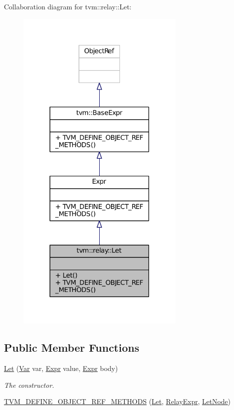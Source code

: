 Collaboration diagram for tvm\+:\+:relay\+:\+:Let\+:
\nopagebreak
\begin{figure}[H]
\begin{center}
\leavevmode
\includegraphics[width=230pt]{classtvm_1_1relay_1_1Let__coll__graph}
\end{center}
\end{figure}
\subsection*{Public Member Functions}
\begin{DoxyCompactItemize}
\item 
\hyperlink{classtvm_1_1relay_1_1Let_a68715334aa9a190648260e776c17ca69}{Let} (\hyperlink{classtvm_1_1relay_1_1Var}{Var} var, \hyperlink{namespacetvm_1_1relay_a5b84e3790f89bb3fad5c7911eeb99531}{Expr} value, \hyperlink{namespacetvm_1_1relay_a5b84e3790f89bb3fad5c7911eeb99531}{Expr} body)
\begin{DoxyCompactList}\small\item\em The constructor. \end{DoxyCompactList}\item 
\hyperlink{classtvm_1_1relay_1_1Let_ad0ec0a1b7a38da71c3e56b6ed78b4c16}{T\+V\+M\+\_\+\+D\+E\+F\+I\+N\+E\+\_\+\+O\+B\+J\+E\+C\+T\+\_\+\+R\+E\+F\+\_\+\+M\+E\+T\+H\+O\+DS} (\hyperlink{classtvm_1_1relay_1_1Let}{Let}, \hyperlink{classtvm_1_1RelayExpr}{Relay\+Expr}, \hyperlink{classtvm_1_1relay_1_1LetNode}{Let\+Node})
\end{DoxyCompactItemize}



